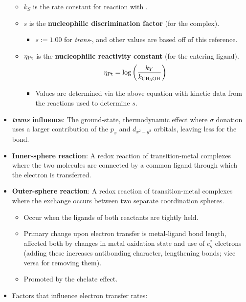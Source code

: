 \documentclass[../notes.tex]{subfiles}
\begin{document}
\begin{itemize}
\begin{itemize}
        \item $k_S$ is the rate constant for reaction with .
        \item $s$ is the \textbf{nucleophilic discrimination factor} (for the complex).
        \begin{itemize}
            \item $s:=1.00$ for \emph{trans}-\ce{[Pt(py)2Cl2]}, and other values are based off of this reference.
        \end{itemize}
        \item $\eta_{\ce{Pt}}$ is the \textbf{nucleophilic reactivity constant} (for the entering ligand).
        \begin{equation*}
            \eta_{\ce{Pt}} = \log\left( \frac{k_Y}{k_{\ce{CH3OH}}} \right)
        \end{equation*}
        \begin{itemize}
            \item Values are determined via the above equation with kinetic data from the reactions used to determine $s$.
        \end{itemize}
    \end{itemize}
    \item \textbf{\emph{trans} influence}: The ground-state, thermodynamic effect where  $\sigma$ donation uses a larger contribution of the $p_x$ and $d_{x^2-y^2}$ orbitals, leaving less for the  bond.
    \item \textbf{Inner-sphere reaction}: A redox reaction of transition-metal complexes where the two molecules are connected by a common ligand through which the electron is transferred.
    \item \textbf{Outer-sphere reaction}: A redox reaction of transition-metal complexes where the exchange occurs between two separate coordination spheres.
    \begin{itemize}
        \item Occur when the ligands of both reactants are tightly held.
        \item Primary change upon electron transfer is metal-ligand bond length, affected both by changes in metal oxidation state and use of $e_g^*$ electrons (adding these increases antibonding character, lengthening bonds; vice versa for removing them).
        \item Promoted by the chelate effect.
    \end{itemize}
    \item Factors that influence electron transfer rates:

\end{itemize}
\end{document}
